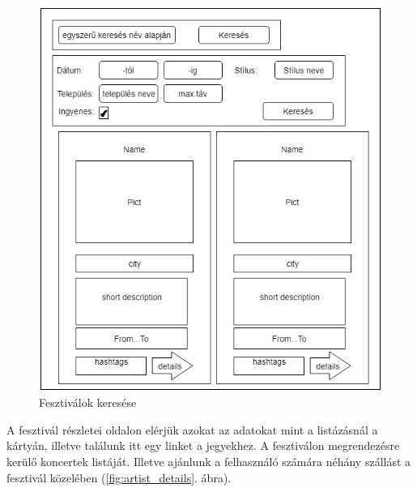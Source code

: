 \begin{figure}
\centering
\includegraphics[scale=0.5]{kepek/fest_search.jpg}
\caption{Fesztiválok keresése}
\label{fig:fest_search}
\end{figure}


A fesztivál részletei oldalon elérjük azokat az adatokat mint a listázásnál a kártyán, illetve találunk itt egy linket a jegyekhez. A fesztiválon megrendezésre kerülő koncertek listáját. Illetve ajánlunk a felhasználó számára néhány szállást a fesztivál közelében (\ref{fig:artist_details}. ábra).

